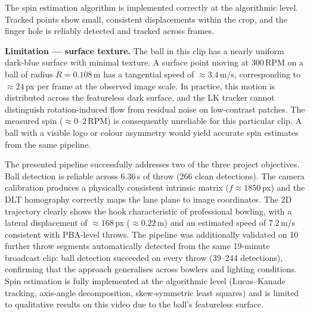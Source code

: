 \documentclass[11pt,twoside]{article}
\begin{document}
The spin estimation algorithm is implemented correctly at the algorithmic level.
Tracked points show small, consistent displacements within the crop, and the finger hole is reliably detected and tracked across frames.

\textbf{Limitation --- surface texture.}
The ball in this clip has a nearly uniform dark-blue surface with minimal texture.
A surface point moving at 300\,RPM on a ball of radius $R = 0.108$\,m has a tangential speed of $\approx 3.4$\,m/s, corresponding to $\approx 24$\,px per frame at the observed image scale.
In practice, this motion is distributed across the featureless dark surface, and the LK tracker cannot distinguish rotation-induced flow from residual noise on low-contrast patches.
The measured spin ($\approx 0$--$2$\,RPM) is consequently unreliable for this particular clip.
A ball with a visible logo or colour asymmetry would yield accurate spin estimates from the same pipeline.

{}
\label{sec:conclusion}

The presented pipeline successfully addresses two of the three project objectives.
Ball detection is reliable across 6.36\,s of throw (266 clean detections).
The camera calibration produces a physically consistent intrinsic matrix ($f \approx 1850$\,px) and the DLT homography correctly maps the lane plane to image coordinates.
The 2D trajectory clearly shows the hook characteristic of professional bowling, with a lateral displacement of $\approx 168$\,px ($\approx 0.22$\,m) and an estimated speed of $7.2$\,m/s consistent with PBA-level throws.
The pipeline was additionally validated on 10 further throw segments automatically detected from the same 19-minute broadcast clip: ball detection succeeded on every throw (39--244 detections), confirming that the approach generalises across bowlers and lighting conditions.
Spin estimation is fully implemented at the algorithmic level (Lucas--Kanade tracking, axis-angle decomposition, skew-symmetric least squares) and is limited to qualitative results on this video due to the ball's featureless surface.
\end{document}
